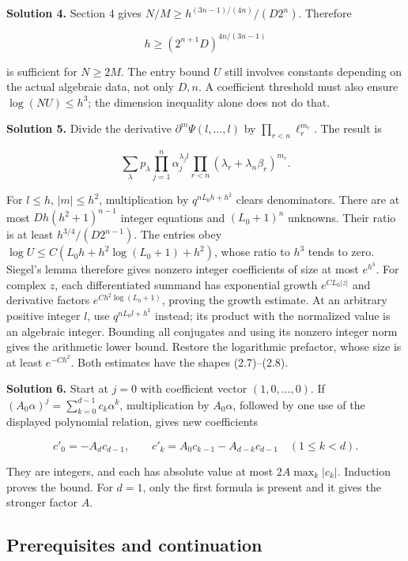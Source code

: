 \documentclass[
  11pt,
  a4paper,
]{article}
\begin{document}
\textbf{Solution 4.} Section 4 gives \(N/M\ge h^{(3n-1)/(4n)}/(D2^n)\).
Therefore

\[
h\ge(2^{n+1}D)^{4n/(3n-1)}
\]

is sufficient for \(N\ge2M\). The entry bound \(U\) still involves
constants depending on the actual algebraic data, not only \(D,n\). A
coefficient threshold must also ensure \(\log(NU)\le h^3\); the
dimension inequality alone does not do that.

\textbf{Solution 5.} Divide the derivative
\(\partial^m\Psi(l,\ldots,l)\) by \(\prod_{r<n}\ell_r^{m_r}\). The
result is

\[
\sum_\lambda p_\lambda\prod_{j=1}^n\alpha_j^{\lambda_jl}
\prod_{r<n}(\lambda_r+\lambda_n\beta_r)^{m_r}.
\]

For \(l\le h\), \(|m|\le h^2\), multiplication by \(q^{nL_0h+h^2}\)
clears denominators. There are at most \(D h(h^2+1)^{n-1}\) integer
equations and \((L_0+1)^n\) unknowns. Their ratio is at least
\(h^{3/4}/(D2^{n-1})\). The entries obey
\(\log U\le C(L_0h+h^2\log(L_0+1)+h^2)\), whose ratio to \(h^3\) tends
to zero. Siegel's lemma therefore gives nonzero integer coefficients of
size at most \(e^{h^3}\). For complex \(z\), each differentiated summand
has exponential growth \(e^{CL_0|z|}\) and derivative factors
\(e^{Ch^2\log(L_0+1)}\), proving the growth estimate. At an arbitrary
positive integer \(l\), use \(q^{nL_0l+h^2}\) instead; its product with
the normalized value is an algebraic integer. Bounding all conjugates
and using its nonzero integer norm gives the arithmetic lower bound.
Restore the logarithmic prefactor, whose size is at least \(e^{-Ch^2}\).
Both estimates have the shapes (2.7)--(2.8).

\textbf{Solution 6.} Start at \(j=0\) with coefficient vector
\((1,0,\ldots,0)\). If \((A_0\alpha)^j=\sum_{k=0}^{d-1}c_k\alpha^k\),
multiplication by \(A_0\alpha\), followed by one use of the displayed
polynomial relation, gives new coefficients

\[
c'_0=-A_dc_{d-1},\qquad
c'_k=A_0c_{k-1}-A_{d-k}c_{d-1}\quad(1\le k<d).
\]

They are integers, and each has absolute value at most
\(2A\max_k|c_k|\). Induction proves the bound. For \(d=1\), only the
first formula is present and it gives the stronger factor \(A\).

\subsection{Prerequisites and
continuation}\label{prerequisites-and-continuation}
\end{document}
